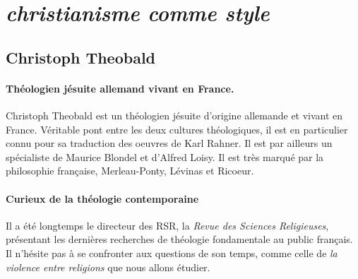  

\section{\textit{christianisme comme style}}


\subsection{Christoph Theobald}

\paragraph{Théologien jésuite allemand vivant en France.} Christoph Theobald est un théologien jésuite d'origine allemande et vivant en France. Véritable pont entre les deux cultures théologiques, il est en particulier connu pour sa traduction des oeuvres de Karl Rahner. Il est par ailleurs un spécialiste de Maurice Blondel et d'Alfred Loisy. Il est très marqué par la philosophie française, Merleau-Ponty, Lévinas et Ricoeur. 

\paragraph{Curieux de la théologie contemporaine} Il a été longtemps le directeur des RSR, la \textit{Revue des Sciences Religieuses}, présentant les dernières recherches de théologie fondamentale au public français. Il n'hésite pas à se confronter aux questions de son temps, comme celle de \textit{la violence entre religions} que nous allons étudier. 
  






